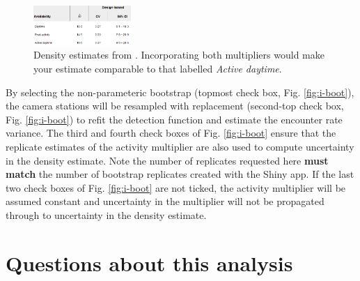 \documentclass[a4paper, 10pt]{article}
\begin{document}
\begin{figure}
\includegraphics[width=0.33\textwidth]{images/density-table.png}
\caption{Density estimates from \citet{howeetal}.  Incorporating both multipliers would make your estimate comparable to that labelled \emph{Active daytime}. \label{fig:dentab}}
\vspace{-25pt}
\end{figure}
\vspace{.6in}

By selecting the non-parameteric bootstrap (topmost check box, Fig. \ref{fig:i-boot}), the camera stations will be resampled with replacement (second-top check box, Fig. \ref{fig:i-boot}) to refit the detection function and estimate the encounter rate variance.  The third and fourth check boxes of Fig. \ref{fig:i-boot} ensure that the replicate estimates of the activity multiplier are also used to compute uncertainty in the density estimate. Note the number of replicates requested here \textbf{must match} the number of bootstrap replicates created with the Shiny app.  If the last two check boxes of Fig. \ref{fig:i-boot} are not ticked, the activity multiplier will be assumed constant and uncertainty in the multiplier will not be propagated through to uncertainty in the density estimate.

\section{Questions about this analysis}
\end{document}
